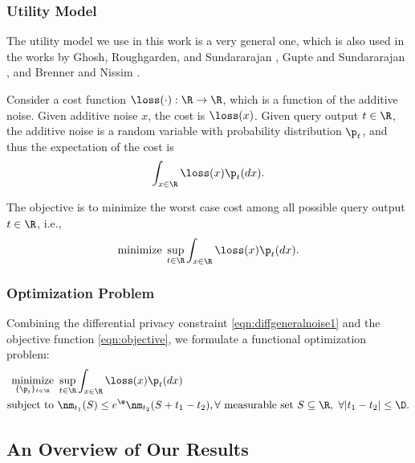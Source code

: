 \subsubsection{Utility Model}

The utility model we use in this work is a very general one, which is also used in the works by Ghosh, Roughgarden, and Sundararajan \cite{Ghosh09}, Gupte and  Sundararajan \cite{minimax10}, and Brenner and Nissim \cite{Nissim10}.

Consider a cost function $\loss(\cdot): \R \to \R$, which is a function of the additive noise. Given additive noise $x$, the cost is $\loss(x)$. Given query output $t \in \R$, the additive noise is a random variable with probability distribution $\p_t$, and thus the expectation of the cost is
\begin{align}
	\int_{x\in \R} \loss(x) \p_t (dx).
\end{align}

The objective is to minimize the worst case cost among all possible query output $t \in \R$, i.e.,
\begin{align}
\text{minimize}\;  \sup_{t \in \R} \int_{x \in \R} \loss(x) \p_t(dx). \label{eqn:objective}
 \end{align}


\subsubsection{Optimization Problem}

Combining the differential privacy constraint \eqref{eqn:diffgeneralnoise1} and the objective function \eqref{eqn:objective}, we formulate a functional optimization problem:
\begin{align}
	\mathop{\text{minimize}}\limits_{ \{\p_t\}_{t \in \R}   } & \ \sup_{t \in \R} \int_{x \in \R} \loss(x) \p_t(dx) \label{eqn:objecinopt}\\
	\text{subject to} & \ \nm_{t_1} (S) \le e^{\e} \nm_{t_2}(S + t_1 - t_2), \forall \ \text{measurable set} \ S\subseteq \R, \ \forall |t_1 - t_2| \le \D.  \label{eqn:diffgeneralnoise}
\end{align}














\subsection{An Overview of Our Results}













